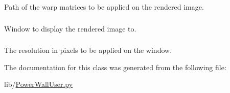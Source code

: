 \-Path of the warp matrices to be applied on the rendered image. 

\hypertarget{classlib_1_1PowerWallUser_1_1PowerWallUser_abe6b7da901a398446c6bba0d075fec75}{
\subsubsection[{window}]{}}\label{classlib_1_1PowerWallUser_1_1PowerWallUser_abe6b7da901a398446c6bba0d075fec75}


\-Window to display the rendered image to. 

\hypertarget{classlib_1_1PowerWallUser_1_1PowerWallUser_acff959d7d5fc0e43505d2682e653f957}{
\subsubsection[{window\-\_\-size}]{}}\label{classlib_1_1PowerWallUser_1_1PowerWallUser_acff959d7d5fc0e43505d2682e653f957}


\-The resolution in pixels to be applied on the window. 



\-The documentation for this class was generated from the following file\-:\begin{DoxyCompactItemize}
\item 
lib/\hyperlink{PowerWallUser_8py}{\-Power\-Wall\-User.\-py}\end{DoxyCompactItemize}
